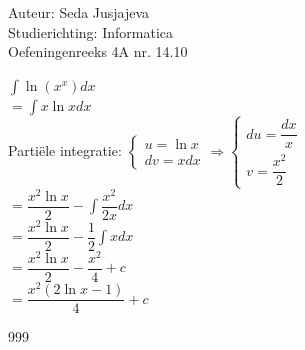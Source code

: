 \documentclass[a4paper]{article}
\newcommand{\integral}{\displaystyle\int}
\begin{document}
\noindent \large Auteur: Seda Jusjajeva\\
\noindent \large Studierichting: Informatica\\
\noindent \large Oefeningenreeks 4A nr. 14.10 \\

\medskip

\normalsize


$\integral \ln(x^x) dx$ \\

$= \integral x\ln x dx$ \\

Partiële integratie: $\left\{\begin{array}{l}
    u = \ln x \\ 
    dv = xdx 
\end{array}\right. \Rightarrow\left\{\begin{array}{l}
    du = \dfrac{dx}{x} \\
    v = \dfrac{x^2}{2} 
\end{array}\right.$ \\

$= \dfrac{x^2 \ln x}{2} - \integral \dfrac{x^2}{2x}dx$ \\

$= \dfrac{x^2 \ln x}{2} - \dfrac{1}{2}\integral xdx$ \\

$= \dfrac{x^2 \ln x}{2} - \dfrac{x^2}{4} + c$ \\

$= \dfrac{x^2 (2\ln x - 1)}{4} + c$ \\

\begin{thebibliography}{999}
\end{thebibliography}
\end{document}
